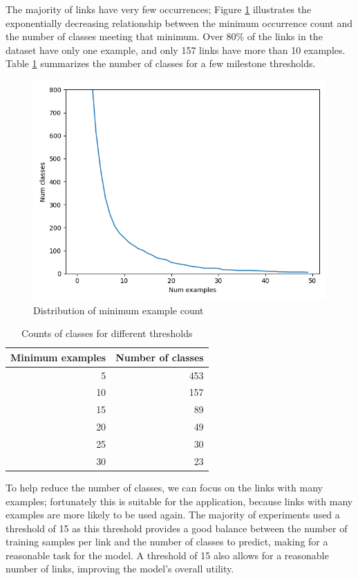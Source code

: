 \documentclass[manuscript,screen,review]{acmart}
\begin{document}
The majority of links have very few occurrences; Figure \ref{fig:org691fd04}
illustrates the exponentially decreasing relationship between the
minimum occurrence count and the number of classes meeting that
minimum. Over 80\% of the links in the dataset have only one example,
and only 157 links have more than 10 examples. Table \ref{tab:org0e24505}
summarizes the number of classes for a few milestone thresholds.

\begin{figure}[htbp]
\centering
\includegraphics[width=.9\linewidth]{images/numclasses.png}
\caption{\label{fig:org691fd04}Distribution of minimum example count}
\end{figure}

\begin{table}[htbp]
\caption{\label{tab:org0e24505}Counts of classes for different thresholds}
\centering
\begin{tabular}{rr}
Minimum examples & Number of classes\\
\hline
5 & 453\\
10 & 157\\
15 & 89\\
20 & 49\\
25 & 30\\
30 & 23\\
\end{tabular}
\end{table}

To help reduce the number of classes, we can focus on the links with
many examples; fortunately this is suitable for the application,
because links with many examples are more likely to be used again. The
majority of experiments used a threshold of 15 as this threshold
provides a good balance between the number of training samples per
link and the number of classes to predict, making for a reasonable
task for the model. A threshold of 15 also allows for a reasonable
number of links, improving the model's overall utility.
\end{document}
